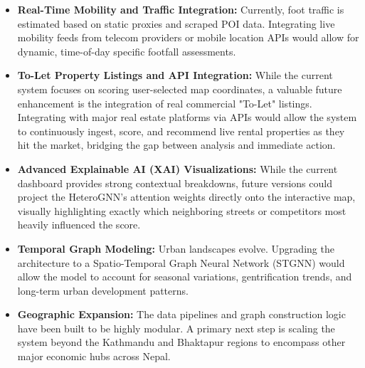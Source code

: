 \begin{itemize}
    \item \textbf{Real-Time Mobility and Traffic Integration:} Currently, foot traffic is estimated based on static proxies and scraped POI data. Integrating live mobility feeds from telecom providers or mobile location APIs would allow for dynamic, time-of-day specific footfall assessments.
    \item \textbf{To-Let Property Listings and API Integration:} While the current system focuses on scoring user-selected map coordinates, a valuable future enhancement is the integration of real commercial "To-Let" listings. Integrating with major real estate platforms via APIs would allow the system to continuously ingest, score, and recommend live rental properties as they hit the market, bridging the gap between analysis and immediate action.
    \item \textbf{Advanced Explainable AI (XAI) Visualizations:} While the current dashboard provides strong contextual breakdowns, future versions could project the HeteroGNN's attention weights directly onto the interactive map, visually highlighting exactly which neighboring streets or competitors most heavily influenced the score.
    \item \textbf{Temporal Graph Modeling:} Urban landscapes evolve. Upgrading the architecture to a Spatio-Temporal Graph Neural Network (STGNN) would allow the model to account for seasonal variations, gentrification trends, and long-term urban development patterns.
    \item \textbf{Geographic Expansion:} The data pipelines and graph construction logic have been built to be highly modular. A primary next step is scaling the system beyond the Kathmandu and Bhaktapur regions to encompass other major economic hubs across Nepal.
\end{itemize}